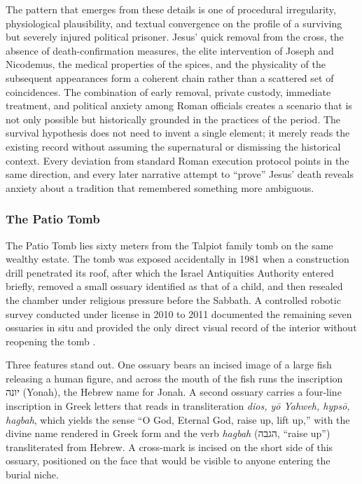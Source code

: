 The pattern that emerges from these details is one of procedural irregularity, physiological plausibility, and textual convergence on the profile of a surviving but severely injured political prisoner.
Jesus' quick removal from the cross, the absence of death-confirmation measures, the elite intervention of Joseph and Nicodemus, the medical properties of the spices, and the physicality of the subsequent appearances form a coherent chain rather than a scattered set of coincidences.
The combination of early removal, private custody, immediate treatment, and political anxiety among Roman officials creates a scenario that is not only possible but historically grounded in the practices of the period.
The survival hypothesis does not need to invent a single element; it merely reads the existing record without assuming the supernatural or dismissing the historical context.
Every deviation from standard Roman execution protocol points in the same direction, and every later narrative attempt to ``prove'' Jesus' death reveals anxiety about a tradition that remembered something more ambiguous.

\subsubsection{The Patio Tomb}\label{subsubsec:patio-tomb}

The Patio Tomb lies sixty meters from the Talpiot family tomb on the same wealthy estate.
The tomb was exposed accidentally in 1981 when a construction drill penetrated its roof, after which the Israel Antiquities Authority entered briefly, removed a small ossuary identified as that of a child, and then resealed the chamber under religious pressure before the Sabbath.
A controlled robotic survey conducted under license in 2010 to 2011 documented the remaining seven ossuaries in situ and provided the only direct visual record of the interior without reopening the tomb \cite{tabor:patio2012,taborjacobovici:discovery2012}.

Three features stand out.
One ossuary bears an incised image of a large fish releasing a human figure, and across the mouth of the fish runs the inscription יונה (Yonah), the Hebrew name for Jonah.
A second ossuary carries a four-line inscription in Greek letters that reads in transliteration \emph{dios, y\=o Yahweh, hyps\=o, hagbah}, which yields the sense ``O God, Eternal God, raise up, lift up,'' with the divine name rendered in Greek form and the verb \emph{hagbah} (הגבה, ``raise up'') transliterated from Hebrew.
A cross-mark is incised on the short side of this ossuary, positioned on the face that would be visible to anyone entering the burial niche.

